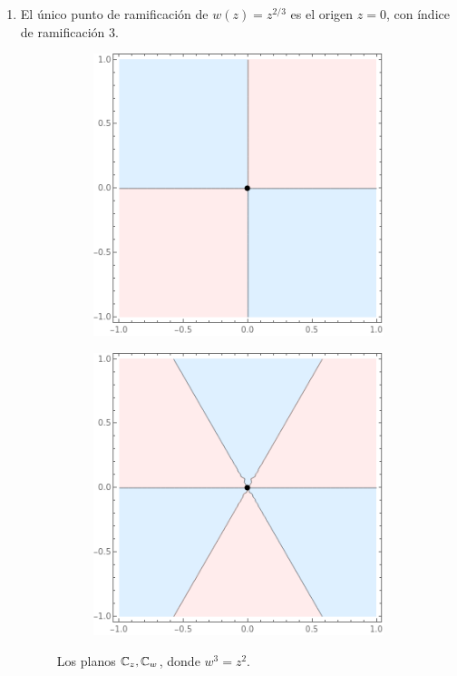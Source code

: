 \begin{solution}
\begin{itemize}
    \begin{enumerate}[label=\alph*)]
        \item El único punto de ramificación de $w(z) = z^{2/3}$ es el origen $z = 0$, con índice de ramificación $3$.
        \begin{figure}[h]
            \centering
            \begin{subfigure}{.4\textwidth}
                \centering
                \includegraphics[scale=0.35]{ramification/1-z.png}
            \end{subfigure}
            \begin{subfigure}{.4\textwidth}
                \centering
                \includegraphics[scale=0.35]{ramification/1-w.png}
            \end{subfigure}
            \caption{Los planos $\mathbb C_z, \mathbb C_w$, donde $w^3 = z^2$.}
        \end{figure}
        

\end{enumerate}
\end{itemize}
\end{solution}

